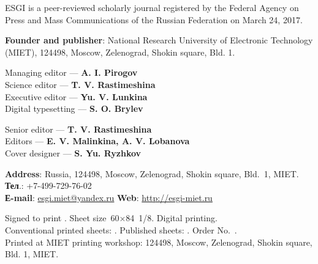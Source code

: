 \begin{otherlanguage}{english}
\begin{flushleft}
\small
ESGI is a peer-reviewed scholarly journal registered by the Federal Agency on Press and Mass Communications
of the Russian Federation on March 24, 2017.

\vspace{1em}
\textbf{Founder and publisher}: National Research University of Electronic Technology (MIET), 124498, Moscow,
Zelenograd, Shokin square, Bld. 1.
\end{flushleft}

\noindent
\begin{minipage}[t]{.48\textwidth}
    
\begin{flushleft}
  \footnotesize
        Managing editor — \textbf{A. I. Pirogov}\\
Science editor — \textbf{T. V. Rastimeshina} \\
Executive editor — \textbf{Yu. V. Lunkina }\\
Digital typesetting — \textbf{S. O. Brylev}
    \end{flushleft}
\end{minipage}\hspace{0.04\textwidth}
\begin{minipage}[t]{.48\textwidth}
    \begin{flushleft}
        \footnotesize
        Senior editor — \textbf{T. V. Rastimeshina}\\
        Editors — \textbf{E. V. Malinkina, A. V. Lobanova}\\
        Cover designer — \textbf{S. Yu. Ryzhkov}
    \end{flushleft}
\end{minipage}

\begin{flushleft}
    \small
    \textbf{Address}: Russia, 124498, Moscow, Zelenograd, Shokin square, Bld. 1, MIET.\\
    \textbf{Тел}.: +7-499-729-76-02\\
    \textbf{Е-mail}: \href{mailto:esgi.miet@yandex.ru}{esgi.miet@yandex.ru} \hspace{3em}
    \textbf{Web}: \url{http://esgi-miet.ru}

     \vspace{1em}
    Signed to print \esgiPDate. Sheet size 60\(×\)84 1/8. Digital printing.\\
    Conventional printed sheets: \esgiUPL{}. Published sheets: \esgiUIL{}. Order No.~\esgiPRN{}.\\
    Printed at MIET printing workshop: 124498, Moscow, Zelenograd, Shokin square, Bld. 1, MIET.
\end{flushleft}

\end{otherlanguage}

\normalsize
\setmainlinespread
